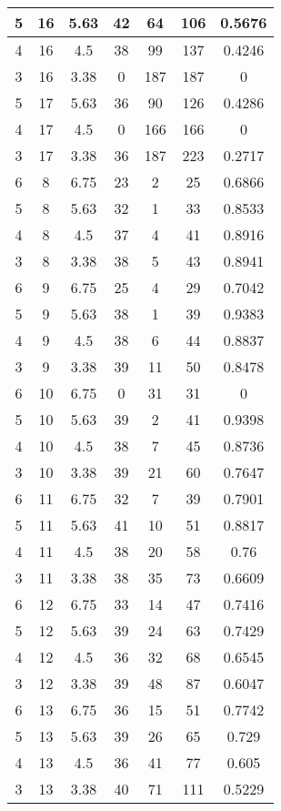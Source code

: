 \documentclass[letterpaper, 12pt]{article}
\begin{document}
\begin{longtable}{|c|c|c|c|c|c|c|}
\hline
5 & 16 & 5.63 & 42 & 64 & 106 & 0.5676 \\
\hline
4 & 16 & 4.5 & 38 & 99 & 137 & 0.4246 \\
\hline
3 & 16 & 3.38 & 0 & 187 & 187 & 0 \\
\hline
5 & 17 & 5.63 & 36 & 90 & 126 & 0.4286 \\
\hline
4 & 17 & 4.5 & 0 & 166 & 166 & 0 \\
\hline
3 & 17 & 3.38 & 36 & 187 & 223 & 0.2717 \\
\hline
6 & 8 & 6.75 & 23 & 2 & 25 & 0.6866 \\
\hline
5 & 8 & 5.63 & 32 & 1 & 33 & 0.8533 \\
\hline
4 & 8 & 4.5 & 37 & 4 & 41 & 0.8916 \\
\hline
3 & 8 & 3.38 & 38 & 5 & 43 & 0.8941 \\
\hline
6 & 9 & 6.75 & 25 & 4 & 29 & 0.7042 \\
\hline
5 & 9 & 5.63 & 38 & 1 & 39 & 0.9383 \\
\hline
4 & 9 & 4.5 & 38 & 6 & 44 & 0.8837 \\
\hline
3 & 9 & 3.38 & 39 & 11 & 50 & 0.8478 \\
\hline
6 & 10 & 6.75 & 0 & 31 & 31 & 0 \\
\hline
5 & 10 & 5.63 & 39 & 2 & 41 & 0.9398 \\
\hline
4 & 10 & 4.5 & 38 & 7 & 45 & 0.8736 \\
\hline
3 & 10 & 3.38 & 39 & 21 & 60 & 0.7647 \\
\hline
6 & 11 & 6.75 & 32 & 7 & 39 & 0.7901 \\
\hline
5 & 11 & 5.63 & 41 & 10 & 51 & 0.8817 \\
\hline
4 & 11 & 4.5 & 38 & 20 & 58 & 0.76 \\
\hline
3 & 11 & 3.38 & 38 & 35 & 73 & 0.6609 \\
\hline
6 & 12 & 6.75 & 33 & 14 & 47 & 0.7416 \\
\hline
5 & 12 & 5.63 & 39 & 24 & 63 & 0.7429 \\
\hline
4 & 12 & 4.5 & 36 & 32 & 68 & 0.6545 \\
\hline
3 & 12 & 3.38 & 39 & 48 & 87 & 0.6047 \\
\hline
6 & 13 & 6.75 & 36 & 15 & 51 & 0.7742 \\
\hline
5 & 13 & 5.63 & 39 & 26 & 65 & 0.729 \\
\hline
4 & 13 & 4.5 & 36 & 41 & 77 & 0.605 \\
\hline
3 & 13 & 3.38 & 40 & 71 & 111 & 0.5229 \\

\end{longtable}
\end{document}
